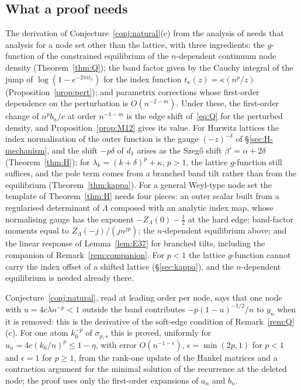 \subsection{What a proof needs}\label{sec:conj-proof}
The derivation of Conjecture~\ref{conj:natural}(c) from the analysis of \cite{PaperII} needs that analysis for a node set
other than the lattice, with three ingredients: the $g$-function of the constrained equilibrium of the $n$-dependent
continuum node density (Theorem~\ref{thm:Q}); the band factor given by the Cauchy integral of the jump of
$\log(1-e^{-2\pi it_\kappa})$ for the index function $t_\kappa(z)=\kappa(n^p/z)$ (Proposition~\ref{prop:pert}); and parametrix
corrections whose first-order dependence on the perturbation is $O(n^{-2-m})$. Under these, the first-order change of
$n^pb_n/c$ at order $n^{-1-m}$ is the edge shift of~\eqref{eq:Q} for the perturbed density, and
Proposition~\ref{prop:M12} gives its value. For Hurwitz lattices the index normalisation of the outer function is the gauge
$(-z)^{-\delta}$ of \S\ref{sec:H-mechanism}, and the shift $-p\delta$ of $d_1$ arises as the Szeg\H{o} shift $\beta'=\alpha+2\delta$
(Theorem~\ref{thm:H}); for $\lambda_k=(k+\delta)^p+\kappa$, $p>1$, the lattice $g$-function still suffices, and the pole term comes from a
branched band tilt rather than from the equilibrium (Theorem~\ref{thm:kappa}). For a general Weyl-type node set the template of
Theorem~\ref{thm:H} needs four pieces: an outer scalar built from a regularised determinant of $\Lambda$ composed with an analytic
index map, whose normalising gauge has the exponent $-Z_\Lambda(0)-\frac12$ at the hard edge; band-factor moments equal to
$Z_\Lambda(-j)/(jn^{jp})$; the $n$-dependent equilibrium above; and the linear response of Lemma~\ref{lem:E37} for branched tilts,
including the companion of Remark~\ref{rem:companion}. For $p<1$ the lattice $g$-function cannot carry the index offset of a shifted
lattice (\S\ref{sec:kappa}), and the $n$-dependent equilibrium is needed already there.

\begin{remark}\label{rem:S2}
Conjecture~\ref{conj:natural}, read at leading order per node, says that one node with $u=4c\lambda n^{-p}<1$ outside the band
contributes $-p(1-u)^{-1/2}/n$ to $y_n$ when it is removed: this is the derivative of the soft-edge condition of
Remark~\ref{rem:Q}(c). For one atom $k_0^{-p}$ of $\sigma_{p,s}$ this is proved, uniformly for $u_n=4c(k_0/n)^p\le1-\eta$, with
error $O(n^{-1-\epsilon})$, $\epsilon=\min(2p,1)$ for $p<1$ and $\epsilon=1$ for $p\ge1$, from the rank-one update of the Hankel
matrices and a contraction argument for the minimal solution of the recurrence at the deleted node; the proof uses only the
first-order expansions of $a_n$ and $b_n$.
\end{remark}

